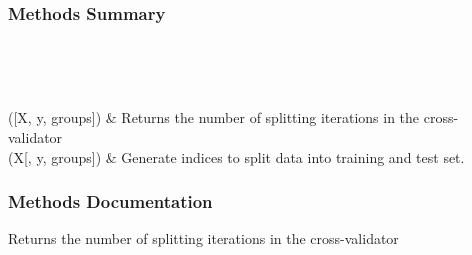 \documentclass[letterpaper,10pt,english]{sphinxmanual}
\begin{document}
\begin{fulllineitems}
\begin{description}
\begin{description}
\end{description}

\end{description}
\subsubsection*{Methods Summary}


\begin{savenotes}\sphinxatlongtablestart\begin{longtable}[c]{}
\hline

\endfirsthead

%
{}\\
\hline

\endhead

\hline
{}\\
\endfoot

\endlastfoot

{\hyperref[\detokenize{api/mastml.data_splitters.LeaveOutPercent:mastml.data_splitters.LeaveOutPercent.get_n_splits}]{}}({[}X, y, groups{]})
&
Returns the number of splitting iterations in the cross-validator
\\
\hline
{\hyperref[\detokenize{api/mastml.data_splitters.LeaveOutPercent:mastml.data_splitters.LeaveOutPercent.split}]{}}(X{[}, y, groups{]})
&
Generate indices to split data into training and test set.
\\
\hline
\end{longtable}\sphinxatlongtableend\end{savenotes}
\subsubsection*{Methods Documentation}

\begin{fulllineitems}
\label{\detokenize{api/mastml.data_splitters.LeaveOutPercent:mastml.data_splitters.LeaveOutPercent.get_n_splits}}
Returns the number of splitting iterations in the cross-validator


\end{fulllineitems}
\end{fulllineitems}
\end{document}
